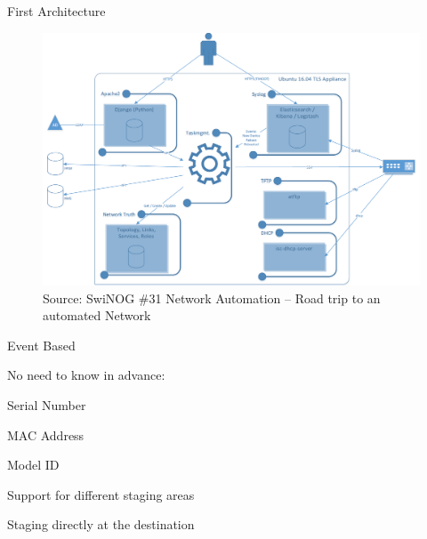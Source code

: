 \documentclass[aspectratio=169]{beamer}
\begin{document}
\begin{frame}{First Architecture}
  \begin{figure}
    \includegraphics[height = 0.78\textheight]{images/staging_robot_arch01_SwiNOG31.png}
    \caption{\footnotesize Source: SwiNOG \#31 Network Automation – Road trip to an automated Network}
  \end{figure}
\end{frame}


\begin{frame}{Event Based}
  \begin{vfilleditems}
    \item No need to know in advance:
    \begin{vfilleditems}
      \item Serial Number
      \item MAC Address
      \item Model ID
    \end{vfilleditems}
    \item Support for different staging areas
    \item Staging directly at the destination
  \end{vfilleditems}
\end{frame}

\end{document}
